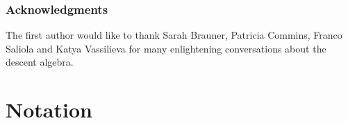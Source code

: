 \documentclass[12pt]{article}
\theoremstyle{definition}%
\theoremstyle{definition}%
\theoremstyle{remark}%
\newcommand{\tup}[1]{\left( #1 \right)}
\newcommand{\set}[1]{\left\{ #1 \right\}}
\newcommand{\kk}{\mathbf{k}}
\newcommand{\ksn}{\kk\left[S_n\right]}
\newcommand{\kf}{\kk\mathcal{F}}
\newcommand{\kfsn}{\left(\kf\right)^{S_n}}
\newcommand{\dsn}{D\left(S_n\right)}
\newcommand{\A}{\mathbf{A}}
\newcommand{\BB}{\mathbf{B}}
\newcommand{\BBa}{\mathbf{B}_{\alpha}}
\newcommand{\BBta}{\widetilde{\mathbf{B}}_{\alpha}}
\newcommand{\CF}{\mathcal{F}}
\newcommand{\wo}{w_0} %
\newcommand{\wotil}{\widetilde{w}_0}
\newcommand{\na}{n_{ \alpha } }%
\newcommand{\Des}{\operatorname{Des}}
\newcommand{\defin}[1]{\textbf{#1}}
\begin{document}
%

\subsubsection*{Acknowledgments}

The first author would like to thank Sarah Brauner, Patricia Commins, Franco Saliola and Katya Vassilieva for many enlightening conversations about the descent algebra.

\section{\label{sec.not}Notation}
\end{document}
